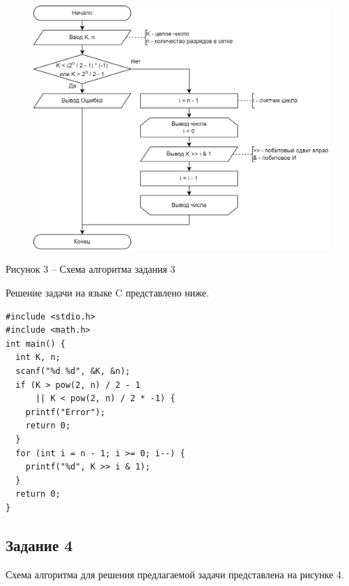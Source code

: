 \documentclass[a4paper,14pt]{extarticle}
\begin{document}
  \begin{figure}[h]
    \centering
    \includegraphics[width=0.8\linewidth]{schemes/s-3}
  \end{figure}
  \begin{center}
    Рисунок 3 – Схема алгоритма задания 3
  \end{center}

  Решение задачи на языке C представлено ниже.

  \begin{lstlisting}[tabsize=2,basicstyle=\ttfamily]
#include <stdio.h>
#include <math.h>
int main() {
  int K, n;
  scanf("%d %d", &K, &n);
  if (K > pow(2, n) / 2 - 1 
      || K < pow(2, n) / 2 * -1) {
    printf("Error");
    return 0;
  }
  for (int i = n - 1; i >= 0; i--) {
    printf("%d", K >> i & 1);
  }
  return 0;
}
  \end{lstlisting}

  \subsection*{Задание 4}
  Схема алгоритма для решения предлагаемой задачи представлена на рисунке 4.
\end{document}
